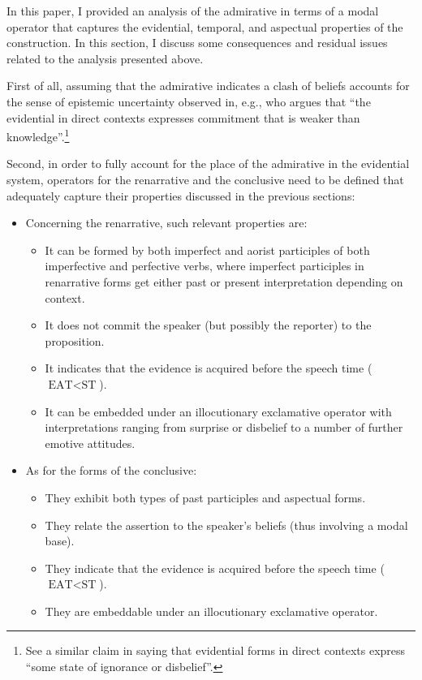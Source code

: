 \documentclass[output=paper]{langscibook}
\begin{document}
In this paper, I provided an analysis of the  admirative in terms of a modal operator that captures the evidential, temporal, and aspectual properties of the construction.
In this section, I discuss some consequences and residual issues related to the analysis presented above.

First of all, assuming that the admirative indicates a clash of beliefs accounts for the sense of epistemic uncertainty observed in, e.g., \citet[510]{Smirnova2013} who argues that ``the evidential in direct contexts expresses commitment that is weaker than knowledge''.\footnote{See a similar claim in \citet[25]{Friedman1981} saying that  evidential forms in direct contexts express ``some state of ignorance or disbelief''.}

Second, in order to fully account for the place of the admirative in the evidential system, operators for the renarrative and the conclusive need to be defined that adequately capture their properties discussed in the previous sections:

\begin{itemize}
    \item Concerning the renarrative, such relevant properties are:

    \begin{itemize}
        \item It can be formed by both imperfect and aorist participles of both imperfective and perfective verbs, where imperfect participles in renarrative forms get either past or present interpretation depending on context.
        \item It does not commit the speaker (but possibly the reporter) to the proposition.
        \item It indicates that the evidence is acquired before the speech time \linebreak ($
        \text{EAT}<\text{ST}$).
        \item It can be embedded under an illocutionary exclamative operator with interpretations ranging from surprise or disbelief to a number of further emotive attitudes.
        \end{itemize}

    \item As for the forms of the conclusive:
    \begin{itemize}
        \item They exhibit both types of past participles and aspectual forms.
        \item They relate the assertion to the speaker's beliefs (thus involving a modal base).
        \item They indicate that the evidence is acquired before the speech time ($
        \text{EAT}<\text{ST}$).
        \item They are embeddable under an illocutionary exclamative operator.
        \end{itemize}

    \end{itemize}
\end{document}
